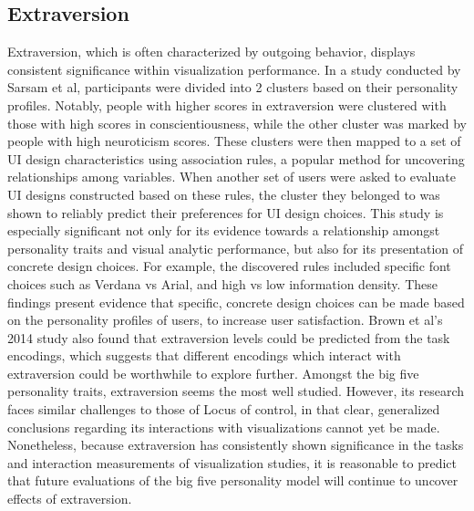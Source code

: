 \documentclass[conference]{IEEEtran}
\begin{document}
\subsection{Extraversion}\label{Extraversion}
Extraversion, which is often characterized by outgoing behavior, displays consistent
significance within visualization performance. In a study conducted by Sarsam et al, 
participants were divided into 2 clusters based on their personality profiles. Notably,
people with higher scores in extraversion were clustered with those with high scores in
conscientiousness, while the other cluster was marked by people with high neuroticism scores.
These clusters were then mapped to a set of UI design characteristics using association rules,
a popular method for uncovering relationships among variables. When another set of users were
asked to evaluate UI designs constructed based on these rules, the cluster they belonged to
was shown to reliably predict their preferences for UI design choices\cite{SarsamFirstLook}.
This study is especially significant not only for its evidence towards a relationship amongst
personality traits and visual analytic performance, but also for its presentation of concrete
design choices. For example, the discovered rules included specific font choices such as Verdana
vs Arial, and high vs low information density. These findings present evidence that
specific, concrete design choices can be made based on the personality profiles of users,
to increase user satisfaction. Brown et al's 2014 study also found that extraversion levels
could be predicted from the task
encodings, which suggests that different encodings which interact with extraversion could
be worthwhile to explore further\cite{Waldo}. Amongst the big five personality traits,
extraversion seems the most well studied. However, its research faces similar challenges to
those of Locus of control, in that clear, generalized conclusions regarding its interactions
with visualizations cannot yet be made. Nonetheless, because extraversion has consistently
shown significance in the tasks and interaction measurements of visualization studies, it
is reasonable to predict that future evaluations of the big five personality model will
continue to uncover effects of extraversion.
\end{document}
